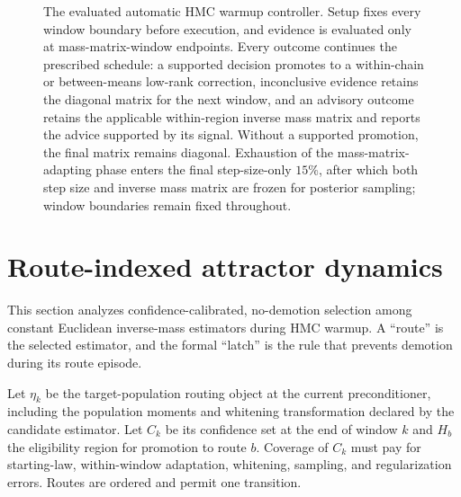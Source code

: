 \documentclass[11pt]{article}
\theoremstyle{plain}
\theoremstyle{definition}
\theoremstyle{remark}
\begin{document}
\begin{figure}[tbp]
{%
}
\caption{The evaluated automatic HMC warmup controller. Setup fixes every
window boundary before execution, and evidence is evaluated only at
mass-matrix-window endpoints. Every outcome continues the prescribed schedule:
a supported decision promotes to a within-chain or between-means low-rank
correction, inconclusive evidence retains the diagonal matrix for the next
window, and an advisory outcome retains the applicable within-region inverse
mass matrix and reports the advice supported by its signal. Without a supported
promotion, the final matrix remains diagonal. Exhaustion of the
mass-matrix-adapting phase enters the final step-size-only $15\%$, after which
both step size and inverse mass matrix are frozen for posterior sampling;
window boundaries remain fixed throughout.}
\label{fig:warmup-path}
\end{figure}

\section{Route-indexed attractor dynamics}\label{sec:attractor}

This section analyzes confidence-calibrated, no-demotion selection among
constant Euclidean inverse-mass estimators during HMC warmup. A ``route'' is
the selected estimator, and the formal ``latch'' is the rule that prevents
demotion during its route episode.

Let $\eta_k$ be the target-population routing object at the current preconditioner,
including the population moments and whitening transformation declared by the
candidate estimator. Let $C_k$ be its confidence set at the end of window $k$ and
$H_b$ the eligibility region for promotion to route $b$. Coverage of $C_k$ must
pay for starting-law, within-window adaptation, whitening, sampling, and
regularization errors. Routes are ordered and permit one transition.
\end{document}
